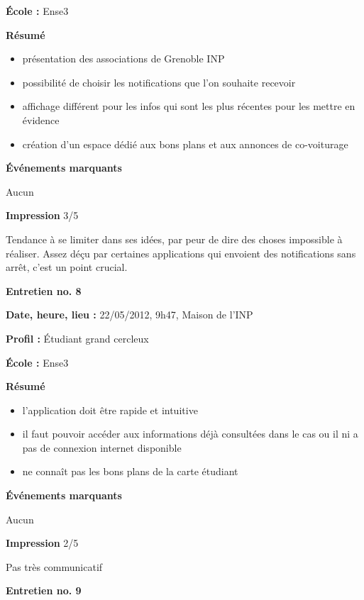 \documentclass[a4paper, 11px]{article}
\begin{document}
\textbf{École : }
Ense3

\textbf{Résumé}
	\begin{itemize}
		\item présentation des associations de Grenoble INP
		\item possibilité de choisir les notifications que l'on souhaite recevoir
		\item affichage différent pour les infos qui sont les plus récentes pour les mettre en évidence
		\item création d'un espace dédié aux bons plans et aux annonces de co-voiturage
	\end{itemize}
\vspace{.25cm}

\textbf{Événements marquants}

Aucun

\textbf{Impression} 3/5

Tendance à se limiter dans ses idées, par peur de dire des choses impossible à réaliser. Assez déçu par certaines applications qui envoient des notifications sans arrêt, c'est un point crucial.


\vspace{.3cm}
 \textbf {\large Entretien no. 8}

\textbf{Date, heure, lieu : }
22/05/2012, 9h47, Maison de l'INP

\textbf{Profil : }
Étudiant grand cercleux


\textbf{École : }
Ense3

\textbf{Résumé}
	\begin{itemize}
		\item l'application doit être rapide et intuitive
		\item il faut pouvoir accéder aux informations déjà consultées dans le cas ou il ni a pas de connexion internet disponible
		\item ne connaît pas les bons plans de la carte étudiant
	\end{itemize}
\vspace{.25cm}

\textbf{Événements marquants}

Aucun

\textbf{Impression} 2/5

Pas très communicatif



\vspace{.3cm}

 \textbf {\large Entretien no. 9}
\end{document}
